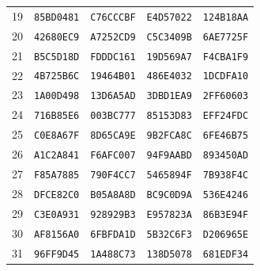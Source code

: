\begin{longtable}{rllll}
19 & \texttt{85BD0481} & \texttt{C76CCCBF} & \texttt{E4D57022} & \texttt{124B18AA}\\
20 & \texttt{42680EC9} & \texttt{A7252CD9} & \texttt{C5C3409B} & \texttt{6AE7725F}\\
21 & \texttt{B5C5D18D} & \texttt{FDDDC161} & \texttt{19D569A7} & \texttt{F4CBA1F9}\\
22 & \texttt{4B725B6C} & \texttt{19464B01} & \texttt{486E4032} & \texttt{1DCDFA10}\\
23 & \texttt{1A00D498} & \texttt{13D6A5AD} & \texttt{3DBD1EA9} & \texttt{2FF60603}\\
24 & \texttt{716B85E6} & \texttt{003BC777} & \texttt{85153D83} & \texttt{EFF24FDC}\\
25 & \texttt{C0E8A67F} & \texttt{8D65CA9E} & \texttt{9B2FCA8C} & \texttt{6FE46B75}\\
26 & \texttt{A1C2A841} & \texttt{F6AFC007} & \texttt{94F9AABD} & \texttt{893450AD}\\
27 & \texttt{F85A7885} & \texttt{790F4CC7} & \texttt{5465894F} & \texttt{7B938F4C}\\
28 & \texttt{DFCE82C0} & \texttt{B05A8A8D} & \texttt{BC9C0D9A} & \texttt{536E4246}\\
29 & \texttt{C3E0A931} & \texttt{928929B3} & \texttt{E957823A} & \texttt{86B3E94F}\\
30 & \texttt{AF8156A0} & \texttt{6FBFDA1D} & \texttt{5B32C6F3} & \texttt{D206965E}\\
31 & \texttt{96FF9D45} & \texttt{1A488C73} & \texttt{138D5078} & \texttt{681EDF34}\\
\bottomrule
\end{longtable}
\endgroup
